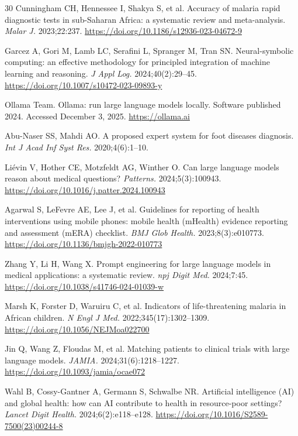 \documentclass[12pt,a4paper]{article}
\begin{document}
\begin{thebibliography}{30}
Cunningham CH, Hennessee I, Shakya S, et al. Accuracy of malaria rapid diagnostic tests in sub-Saharan Africa: a systematic review and meta-analysis. \textit{Malar J.} 2023;22:237. \url{https://doi.org/10.1186/s12936-023-04672-9}

Garcez A, Gori M, Lamb LC, Serafini L, Spranger M, Tran SN. Neural-symbolic computing: an effective methodology for principled integration of machine learning and reasoning. \textit{J Appl Log.} 2024;40(2):29--45. \url{https://doi.org/10.1007/s10472-023-09893-y}

Ollama Team. Ollama: run large language models locally. Software published 2024. Accessed December 3, 2025. \url{https://ollama.ai}

Abu-Naser SS, Mahdi AO. A proposed expert system for foot diseases diagnosis. \textit{Int J Acad Inf Syst Res.} 2020;4(6):1--10.

Li\'{e}vin V, Hother CE, Motzfeldt AG, Winther O. Can large language models reason about medical questions? \textit{Patterns.} 2024;5(3):100943. \url{https://doi.org/10.1016/j.patter.2024.100943}

Agarwal S, LeFevre AE, Lee J, et al. Guidelines for reporting of health interventions using mobile phones: mobile health (mHealth) evidence reporting and assessment (mERA) checklist. \textit{BMJ Glob Health.} 2023;8(3):e010773. \url{https://doi.org/10.1136/bmjgh-2022-010773}

Zhang Y, Li H, Wang X. Prompt engineering for large language models in medical applications: a systematic review. \textit{npj Digit Med.} 2024;7:45. \url{https://doi.org/10.1038/s41746-024-01039-w}

Marsh K, Forster D, Waruiru C, et al. Indicators of life-threatening malaria in African children. \textit{N Engl J Med.} 2022;345(17):1302--1309. \url{https://doi.org/10.1056/NEJMoa022700}

Jin Q, Wang Z, Floudas M, et al. Matching patients to clinical trials with large language models. \textit{JAMIA.} 2024;31(6):1218--1227. \url{https://doi.org/10.1093/jamia/ocae072}

Wahl B, Cossy-Gantner A, Germann S, Schwalbe NR. Artificial intelligence (AI) and global health: how can AI contribute to health in resource-poor settings? \textit{Lancet Digit Health.} 2024;6(2):e118--e128. \url{https://doi.org/10.1016/S2589-7500(23)00244-8}


\end{thebibliography}
\end{document}
